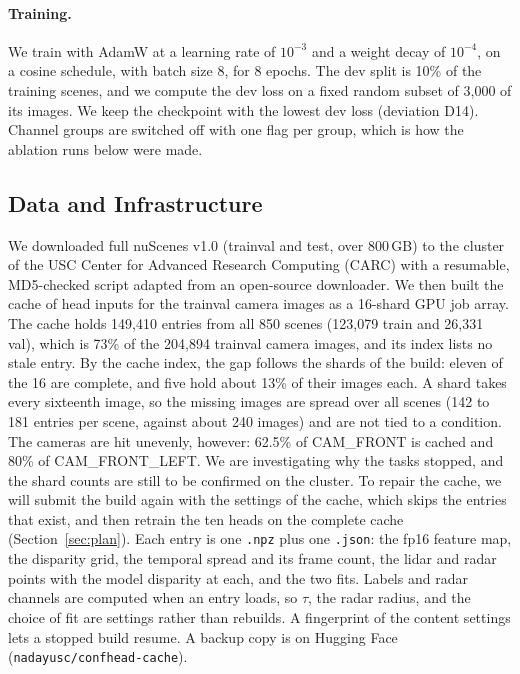 \paragraph{Training.} We train with AdamW at a learning rate of $10^{-3}$ and a weight decay of $10^{-4}$, on a cosine schedule, with batch size 8, for 8 epochs. The dev split is 10\% of the training scenes, and we compute the dev loss on a fixed random subset of 3,000 of its images. We keep the checkpoint with the lowest dev loss (deviation D14). Channel groups are switched off with one flag per group, which is how the ablation runs below were made.

\subsection{Data and Infrastructure}

We downloaded full nuScenes v1.0 (trainval and test, over 800\,GB) to the cluster of the USC Center for Advanced Research Computing (CARC) with a resumable, MD5-checked script adapted from an open-source downloader. We then built the cache of head inputs for the trainval camera images as a 16-shard GPU job array. The cache holds 149,410 entries from all 850 scenes (123,079 train and 26,331 val), which is 73\% of the 204,894 trainval camera images, and its index lists no stale entry. By the cache index, the gap follows the shards of the build: eleven of the 16 are complete, and five hold about 13\% of their images each. A shard takes every sixteenth image, so the missing images are spread over all scenes (142 to 181 entries per scene, against about 240 images) and are not tied to a condition. The cameras are hit unevenly, however: 62.5\% of CAM\_FRONT is cached and 80\% of CAM\_FRONT\_LEFT. We are investigating why the tasks stopped, and the shard counts are still to be confirmed on the cluster. To repair the cache, we will submit the build again with the settings of the cache, which skips the entries that exist, and then retrain the ten heads on the complete cache (Section~\ref{sec:plan}). Each entry is one \texttt{.npz} plus one \texttt{.json}: the fp16 feature map, the disparity grid, the temporal spread and its frame count, the lidar and radar points with the model disparity at each, and the two fits. Labels and radar channels are computed when an entry loads, so $\tau$, the radar radius, and the choice of fit are settings rather than rebuilds. A fingerprint of the content settings lets a stopped build resume. A backup copy is on Hugging Face (\texttt{nadayusc/confhead-cache}).

